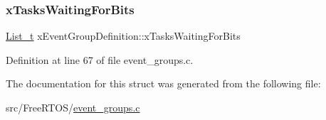 \mbox{\label{structx_event_group_definition_a6570ba98d93dcba9cb03de0c62df9044}} 
\subsubsection{\texorpdfstring{x\+Tasks\+Waiting\+For\+Bits}{xTasksWaitingForBits}}
{\footnotesize\ttfamily \hyperlink{list_8h_afd590ef6400071b4d63d65ef90bea7f4}{List\+\_\+t} x\+Event\+Group\+Definition\+::x\+Tasks\+Waiting\+For\+Bits}



Definition at line 67 of file event\+\_\+groups.\+c.



The documentation for this struct was generated from the following file\+:\begin{DoxyCompactItemize}
\item 
src/\+Free\+R\+T\+O\+S/\hyperlink{event__groups_8c}{event\+\_\+groups.\+c}\end{DoxyCompactItemize}
